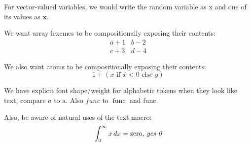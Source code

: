 For vector-valued variables, we would write the random variable as $\bm{\mathrm{x}}$ and one of its values as $\bm{x}$.


We want array lexemes to be compositionally exposing their contents:
\[ \begin{array}{cc} a+1 & b-2 \\ c+3 & d-4 \end{array} \]

We also want atoms to be compositionally exposing their contents:
\[ 1+\left( \text{$x$ if $x<0$ else $y$} \right) \]


\DeclareMathOperator{\func}{func}
We have explicit font shape/weight for alphabetic tokens when they look like text, compare $a$ to $\mathrm{a}$.
Also $\mathit{func}$ to $\func$ and $\mathrm{func}$.

Also, be aware of natural uses of the text macro:
\[ \int_0^\infty x\,dx = \text{zero, \it yes 0} \]